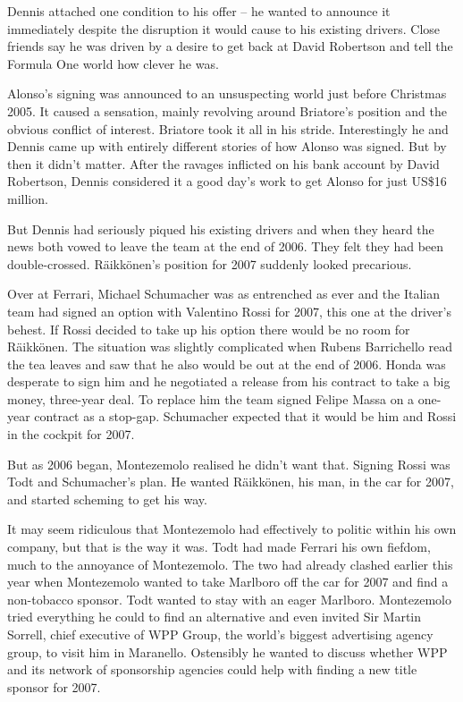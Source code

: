 \documentclass{article}
\begin{document}
Dennis attached one condition to his offer – he wanted to announce it immediately despite the disruption it would cause to his existing drivers. Close friends say he was driven by a desire to get back at David Robertson and tell the Formula One world how clever he was.

Alonso’s signing was announced to an unsuspecting world just before Christmas 2005. It caused a sensation, mainly revolving around Briatore’s position and the obvious conflict of interest. Briatore took it all in his stride. Interestingly he and Dennis came up with entirely different stories of how Alonso was signed. But by then it didn’t matter. After the ravages inflicted on his bank account by David Robertson, Dennis considered it a good day’s work to get Alonso for just US\$16 million.

But Dennis had seriously piqued his existing drivers and when they heard the news both vowed to leave the team at the end of 2006. They felt they had been double-crossed. Räikkönen’s position for 2007 suddenly looked precarious.

Over at Ferrari, Michael Schumacher was as entrenched as ever and the Italian team had signed an option with Valentino Rossi for 2007, this one at the driver’s behest. If Rossi decided to take up his option there would be no room for Räikkönen. The situation was slightly complicated when Rubens Barrichello read the tea leaves and saw that he also would be out at the end of 2006. Honda was desperate to sign him and he negotiated a release from his contract to take a big money, three-year deal. To replace him the team signed Felipe Massa on a one-year contract as a stop-gap. Schumacher expected that it would be him and Rossi in the cockpit for 2007.

But as 2006 began, Montezemolo realised he didn’t want that. Signing Rossi was Todt and Schumacher’s plan. He wanted Räikkönen, his man, in the car for 2007, and started scheming to get his way.

It may seem ridiculous that Montezemolo had effectively to politic within his own company, but that is the way it was. Todt had made Ferrari his own fiefdom, much to the annoyance of Montezemolo. The two had already clashed earlier this year when Montezemolo wanted to take Marlboro off the car for 2007 and find a non-tobacco sponsor. Todt wanted to stay with an eager Marlboro. Montezemolo tried everything he could to find an alternative and even invited Sir Martin Sorrell, chief executive of WPP Group, the world’s biggest advertising agency group, to visit him in Maranello. Ostensibly he wanted to discuss whether WPP and its network of sponsorship agencies could help with finding a new title sponsor for 2007.
\end{document}
